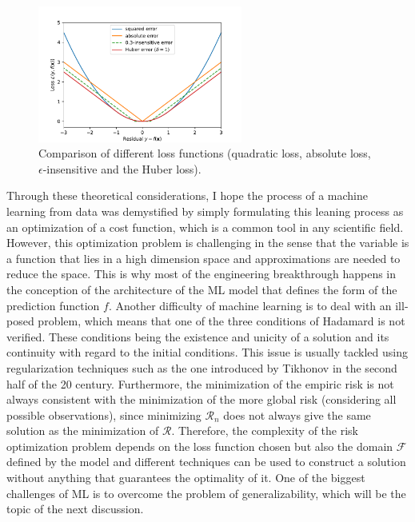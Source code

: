 \documentclass[main]{subfiles}
\begin{document}
\begin{figure}[ht]
  \centering
    \includegraphics[width=0.6\textwidth]{figures/4-ml/loss_comparison.pdf}
    \caption{Comparison of different loss functions (quadratic loss, absolute loss, $\epsilon$-insensitive and the Huber loss). }\label{fgr:loss_comp}
\end{figure}

Through these theoretical considerations, I hope the process of a machine learning from data was demystified by simply formulating this leaning process as an optimization of a cost function, which is a common tool in any scientific field. However, this optimization problem is challenging in the sense that the variable is a function that lies in a high dimension space and approximations are needed to reduce the space. This is why most of the engineering breakthrough happens in the conception of the architecture of the ML model that defines the form of the prediction function $f$. Another difficulty of machine learning is to deal with an ill-posed problem, which means that one of the three conditions of Hadamard is not verified. These conditions being the existence and unicity of a solution and its continuity  with regard to the initial conditions. This issue is usually tackled using regularization techniques such as the one introduced by Tikhonov in the second half of the 20 century. Furthermore, the minimization of the empiric risk is not always consistent with the minimization of the more global risk (considering all possible observations), since minimizing $\mathcal{R}_n$ does not always give the same solution as the minimization of $\mathcal{R}$. Therefore, the complexity of the risk optimization problem depends on the loss function chosen but also the domain $\mathcal{F}$ defined by the model and different techniques can be used to construct a solution without anything that guarantees the optimality of it. One of the biggest challenges of ML is to overcome the problem of generalizability, which will be the topic of the next discussion.
\end{document}
